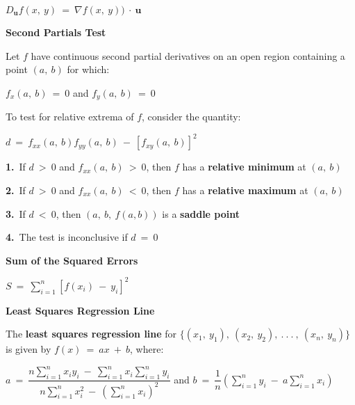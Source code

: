 \documentclass{article}
\begin{document}
\begin{large}
\hspace{2.5in} $D_{\textbf{u}}f(x,\ y)\ =\ \nabla f(x,\ y))\ \cdot\ \textbf{u}$

\vspace{-0.1in}
\textbf{Second Partials Test}

\vspace{-0.2in}
\hspace{0.1in} Let $f$ have continuous second partial derivatives on an open region containing a point $(a,\ b)$ for which:

\vspace{-0.3in}
\hspace{2.0in} $f_{x}(a,\ b)\ =\ 0$ and $f_{y}(a,\ b)\ =\ 0$

\hspace{0.1in} To test for relative extrema of $f$, consider the quantity:

\hspace{2.0in} $d\ =\ f_{xx}(a,\ b)f_{yy}(a,\ b)\ -\ [f_{xy}(a,\ b)]^{2}$

\hspace{0.1in} \textbf{1.}\ If $d\ >\ 0$ and $f_{xx}(a,\ b)\ >\ 0$, then $f$ has a \textbf{relative minimum} at $(a,\ b)$

\hspace{0.1in} \textbf{2.}\ If $d\ >\ 0$ and $f_{xx}(a,\ b)\ <\ 0$, then $f$ has a \textbf{relative maximum} at $(a,\ b)$

\hspace{0.1in} \textbf{3.}\ If $d\ <\ 0$, then $(a,\ b,\ f(a,b))$ is a \textbf{saddle point}

\hspace{0.1in} \textbf{4.}\ The test is inconclusive if $d\ =\ 0$

\textbf{Sum of the Squared Errors}

\hspace{2.5in} $S\ =\ \displaystyle\sum^{n}_{i=1}[f(x_{i})\ -\ y_{i}]^{2}$

\textbf{Least Squares Regression Line}

\hspace{0.1in} The \textbf{least squares regression line} for $\{(x_{1},\ y_{1}),\ (x_{2},\ y_{2}),\ .\ .\ .\ ,\ (x_{n},\ y_{n})\}$ is given by $f(x)\ =\ ax\ +\ b$, where:

\hspace{1.0in} $a\ =\ \dfrac{n\displaystyle\sum^{n}_{i=1}x_{i}y_{i}\ -\ \displaystyle\sum^{n}_{i=1}x_{i}\displaystyle\sum^{n}_{i=1}y_{i}}{n\displaystyle\sum^{n}_{i=1}x_{i}^{2}\ -\ \left(\displaystyle\sum^{n}_{i=1}x_{i}\right)^{2}}$ and $b\ =\ \dfrac{1}{n}\left(\displaystyle\sum^{n}_{i=1}y_{i}\ -\ a\displaystyle\sum^{n}_{i=1}x_{i}\right)$


\end{large}
\end{document}
